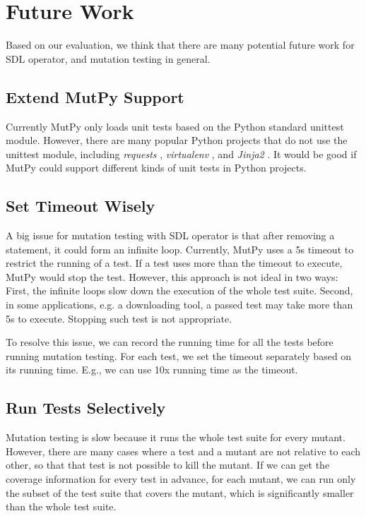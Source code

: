 \documentclass[12pt]{article}
\begin{document}
\section{Future Work}

Based on our evaluation, we think that there are many potential future work for SDL operator, and mutation testing in general.

\subsection{Extend MutPy Support}

Currently MutPy only loads unit tests based on the Python standard unittest module. However, there are many popular Python projects that do not use the unittest module, including \emph{requests} \cite{requests}, \emph{virtualenv} \cite{virtualenv}, and \emph{Jinja2} \cite{jinja2}. It would be good if MutPy could support different kinds of unit tests in Python projects.

\subsection{Set Timeout Wisely}

A big issue for mutation testing with SDL operator is that after removing a statement, it could form an infinite loop. Currently, MutPy uses a 5s timeout to restrict the running of a test. If a test uses more than the timeout to execute, MutPy would stop the test. However, this approach is not ideal in two ways: First, the infinite loops slow down the execution of the whole test suite. Second, in some applications, e.g. a downloading tool, a passed test may take more than 5s to execute. Stopping such test is not appropriate.

To resolve this issue, we can record the running time for all the tests before running mutation testing. For each test, we set the timeout separately based on its running time. E.g., we can use 10x running time as the timeout.

\subsection{Run Tests Selectively}

Mutation testing is slow because it runs the whole test suite for every mutant. However, there are many cases where a test and a mutant are not relative to each other, so that that test is not possible to kill the mutant. If we can get the coverage information for every test in advance, for each mutant, we can run only the subset of the test suite that covers the mutant, which is significantly smaller than the whole test suite.
\end{document}
